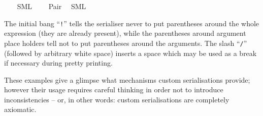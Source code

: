 \begin{isabellebody}
\ {\isacharasterisk}\isanewline
\ \ {\isacharparenleft}SML\ \ {}\ {\isachardoublequoteopen}{\isacharasterisk}{\isachardoublequoteclose}{\isacharparenright}\isanewline
{}\isamarkupfalse%
\ Pair\isanewline
\ \ {\isacharparenleft}SML\ {\isachardoublequoteopen}{\isacharbang}{\isacharparenleft}{\isacharparenleft}{\isacharunderscore}{\isacharparenright}{\isacharcomma}{\isacharslash}\ {\isacharparenleft}{\isacharunderscore}{\isacharparenright}{\isacharparenright}{\isachardoublequoteclose}{\isacharparenright}%
\endisatagquotett
{\isafoldquotett}%
%
\isadelimquotett
%
\endisadelimquotett
%
\begin{isamarkuptext}%
\noindent The initial bang ``\verb|!|'' tells the serialiser
  never to put
  parentheses around the whole expression (they are already present),
  while the parentheses around argument place holders
  tell not to put parentheses around the arguments.
  The slash ``\verb|/|'' (followed by arbitrary white space)
  inserts a space which may be used as a break if necessary
  during pretty printing.

  These examples give a glimpse what mechanisms
  custom serialisations provide; however their usage
  requires careful thinking in order not to introduce
  inconsistencies -- or, in other words:
  custom serialisations are completely axiomatic.


\end{isamarkuptext}
\end{isabellebody}
